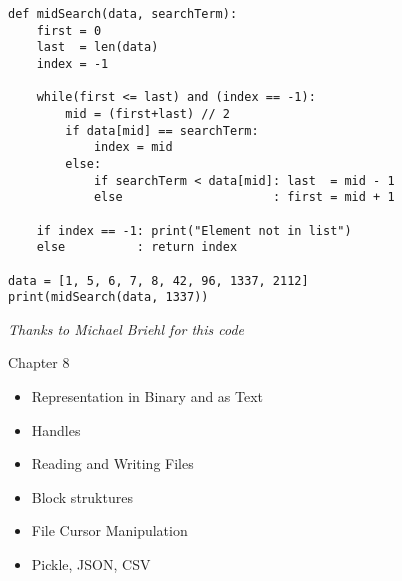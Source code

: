 
\begin{frame}[fragile]
%
\begin{codebox}
\begin{verbatim}
def midSearch(data, searchTerm):
    first = 0
    last  = len(data)
    index = -1
    
    while(first <= last) and (index == -1):
        mid = (first+last) // 2
        if data[mid] == searchTerm:
            index = mid
        else:
            if searchTerm < data[mid]: last  = mid - 1
            else                     : first = mid + 1

    if index == -1: print("Element not in list")
    else          : return index

data = [1, 5, 6, 7, 8, 42, 96, 1337, 2112]
print(midSearch(data, 1337))
\end{verbatim}
\end{codebox}
%
\begin{flushright}
\scriptsize \emph{Thanks to Michael Briehl for this code}
\end{flushright}
%
\end{frame}


\begin{frame}[fragile]{Chapter 8}
%
\begin{itemize}
\item Representation in Binary and as Text
\item Handles
\item Reading and Writing Files
\item Block struktures
\item File Cursor Manipulation
\item Pickle, JSON, CSV
\end{itemize}
%
\end{frame}


